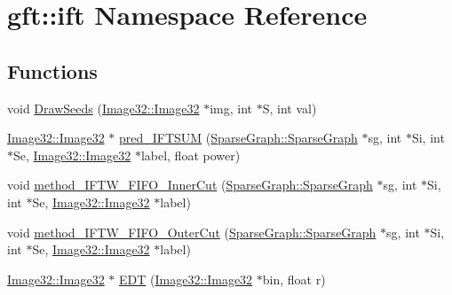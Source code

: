 \hypertarget{namespacegft_1_1ift}{\section{gft\-:\-:ift Namespace Reference}
\label{namespacegft_1_1ift}
}
\subsection*{Functions}
\begin{DoxyCompactItemize}
\item 
void \hyperlink{namespacegft_1_1ift_a14faa1764e2f2f4fabf98d58b3abea68}{Draw\-Seeds} (\hyperlink{namespacegft_1_1Image32_a6c5a03566b593bb406f1fe33266a0382}{Image32\-::\-Image32} $\ast$img, int $\ast$S, int val)
\item 
\hyperlink{namespacegft_1_1Image32_a6c5a03566b593bb406f1fe33266a0382}{Image32\-::\-Image32} $\ast$ \hyperlink{namespacegft_1_1ift_aa57558f0138e50e4d2b8ec9dfda50a2a}{pred\-\_\-\-I\-F\-T\-S\-U\-M} (\hyperlink{namespacegft_1_1SparseGraph_ac9894ef1cb4a15f8970806af9f79cc3f}{Sparse\-Graph\-::\-Sparse\-Graph} $\ast$sg, int $\ast$Si, int $\ast$Se, \hyperlink{namespacegft_1_1Image32_a6c5a03566b593bb406f1fe33266a0382}{Image32\-::\-Image32} $\ast$label, float power)
\item 
void \hyperlink{namespacegft_1_1ift_abf4966ab0e95e9313152819492a28d15}{method\-\_\-\-I\-F\-T\-W\-\_\-\-F\-I\-F\-O\-\_\-\-Inner\-Cut} (\hyperlink{namespacegft_1_1SparseGraph_ac9894ef1cb4a15f8970806af9f79cc3f}{Sparse\-Graph\-::\-Sparse\-Graph} $\ast$sg, int $\ast$Si, int $\ast$Se, \hyperlink{namespacegft_1_1Image32_a6c5a03566b593bb406f1fe33266a0382}{Image32\-::\-Image32} $\ast$label)
\item 
void \hyperlink{namespacegft_1_1ift_a028e23213503b2b17764fc0906050701}{method\-\_\-\-I\-F\-T\-W\-\_\-\-F\-I\-F\-O\-\_\-\-Outer\-Cut} (\hyperlink{namespacegft_1_1SparseGraph_ac9894ef1cb4a15f8970806af9f79cc3f}{Sparse\-Graph\-::\-Sparse\-Graph} $\ast$sg, int $\ast$Si, int $\ast$Se, \hyperlink{namespacegft_1_1Image32_a6c5a03566b593bb406f1fe33266a0382}{Image32\-::\-Image32} $\ast$label)
\item 
\hyperlink{namespacegft_1_1Image32_a6c5a03566b593bb406f1fe33266a0382}{Image32\-::\-Image32} $\ast$ \hyperlink{namespacegft_1_1ift_a0ca06e780398a2442d49eab54bab4052}{E\-D\-T} (\hyperlink{namespacegft_1_1Image32_a6c5a03566b593bb406f1fe33266a0382}{Image32\-::\-Image32} $\ast$bin, float r)
\end{DoxyCompactItemize}


